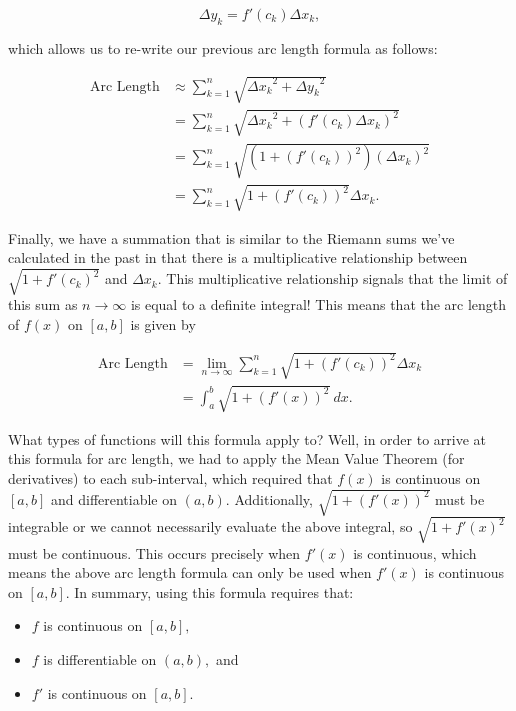 \documentclass[handout,nooutcomes]{ximera}
\begin{document}
$$\Delta y_k = f'(c_k) \Delta x_k,$$

which allows us to re-write our previous arc length formula as follows:

\begin{align*}
\text{Arc Length} &\approx \displaystyle\sum_{k=1}^n \sqrt{{{\Delta x}_k}^2+{{\Delta y}_k}^2} \\
&= \displaystyle\sum_{k=1}^n \sqrt{{{\Delta x}_k}^2 + (f'(c_k) \Delta x_k)^2} \\
&= \displaystyle\sum_{k=1}^n \sqrt{(1+(f'(c_k))^2)(\Delta x _k)^2} \\
&= \displaystyle\sum_{k=1}^n \sqrt{1+(f'(c_k))^2} \Delta x _k.
\end{align*}

Finally, we have a summation that is similar to the Riemann sums we've calculated in the past in that there is a multiplicative relationship between $\sqrt{1+{f'(c_k)}^2}$ and $\Delta x _k$.  This multiplicative relationship signals that the limit of this sum as $n \to \infty$ is equal to a definite integral!  This means that the arc length of $f(x)$ on $[a,b]$ is given by

\begin{align*}
\text{Arc Length} &= \displaystyle\lim_{n \to \infty} \displaystyle\sum_{k=1}^n \sqrt{1+(f'(c_k))^2} \Delta x _k \\ 
&= \displaystyle\int_{a}^{b} \sqrt{1+(f'(x))^2} \ dx .
\end{align*}

What types of functions will this formula apply to?  Well, in order to arrive at this formula for arc length, we had to apply the Mean Value Theorem (for derivatives) to each sub-interval, which required that $f(x)$ is continuous on $[a,b]$ and differentiable on $(a,b).$  Additionally, $\sqrt{1+(f'(x))^2}$ must be integrable or we cannot necessarily evaluate the above integral, so $\sqrt{1+{f'(x)}^2}$ must be continuous.  This occurs precisely when $f'(x)$ is continuous, which means the above arc length formula can only be used when $f'(x)$ is continuous on $[a,b]$.  In summary, using this formula requires that: 

\begin{itemize}

\item $f$ is continuous on $[a,b],$
\item $f$ is differentiable on $(a,b),$ and
\item $f'$ is continuous on $[a,b]$.

\end{itemize}
\end{document}
